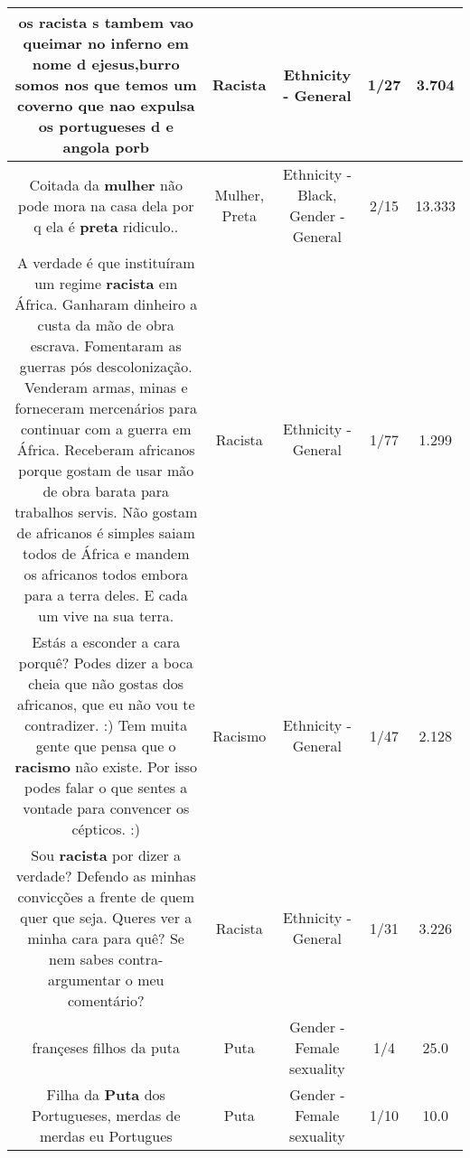 \documentclass[11pt]{article}
\newlength\mylength
\begin{document}
\begin{center}
\begin{longtable}{|C{.65\mylength}|C{.30\mylength}|C{.12\mylength}|C{.12\mylength}|C{.12\mylength}|}
  \small os \textbf{racista} s tambem vao queimar  no inferno  em nome  d ejesus,burro somos  nos  que temos  um  coverno que nao expulsa  os portugueses  d e angola porb\normalsize   & Racista & Ethnicity - General & 1/27 & 3.704 \\  \hline
  \small Coitada da \textbf{mulher} não pode mora na casa dela por q ela é \textbf{preta}  ridiculo..\normalsize   & Mulher, Preta & Ethnicity - Black, Gender - General & 2/15 & 13.333 \\  \hline
  \small A verdade é que instituíram um regime \textbf{racista} em África. Ganharam dinheiro a custa da mão de obra escrava. Fomentaram as guerras pós descolonização. Venderam armas, minas e forneceram mercenários para continuar com a guerra em África. Receberam africanos porque gostam de usar mão de obra barata para trabalhos servis. Não gostam de africanos é simples saiam todos de África e mandem os africanos todos embora para a terra deles. E cada um vive na sua terra.\normalsize   & Racista & Ethnicity - General & 1/77 & 1.299 \\  \hline
  \small Estás a esconder a cara porquê? Podes dizer a boca cheia que não gostas dos africanos, que eu não vou te contradizer. :) Tem muita gente que pensa que﻿ o \textbf{racismo} não existe. Por isso podes falar o que sentes a vontade para convencer﻿ os cépticos. :)\normalsize   & Racismo & Ethnicity - General & 1/47 & 2.128 \\  \hline
  \small Sou \textbf{racista} por dizer a verdade? Defendo as minhas convicções a frente de quem quer que seja. Queres ver a minha cara para quê? Se nem sabes contra-argumentar o meu comentário?\normalsize   & Racista & Ethnicity - General & 1/31 & 3.226 \\  \hline
  \small françeses filhos da puta\normalsize   & Puta & Gender - Female sexuality & 1/4 & 25.0 \\  \hline
  \small Filha da \textbf{Puta} dos Portugueses, merdas de merdas eu Portugues\normalsize   & Puta & Gender - Female sexuality & 1/10 & 10.0 \\  \hline
  
\end{longtable}
\end{center}
\end{document}
